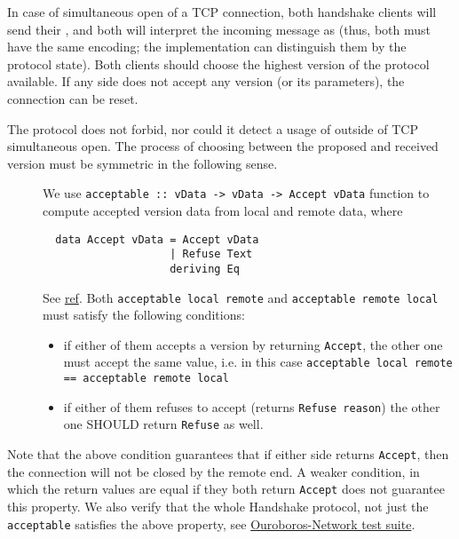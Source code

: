In case of simultaneous open of a TCP connection, both handshake clients will
send their \MsgProposeVersions{}, and both will interpret the incoming message as
\MsgReplyVersions{} (thus, both must have the same encoding; the implementation
can distinguish them by the protocol state).  Both clients should choose the
highest version of the protocol available.  If any side does not accept any
version (or its parameters), the connection can be reset.

The protocol does not forbid, nor could it detect a usage of
\MsgReplyVersions{} outside of TCP simultaneous open.  The process of
choosing between the proposed and received version must be symmetric in the
following sense.

\begin{description}
  \item[]
    We use \texttt{acceptable :: vData -> vData -> Accept vData}
    function to compute accepted version data from local and remote data,
    where
\begin{verbatim}
  data Accept vData = Accept vData
                    | Refuse Text
                    deriving Eq
\end{verbatim}
    See
    \href{https://ouroboros-network.cardano.intersectmbo.org/ouroboros-network-framework/Ouroboros-Network-Protocol-Handshake-Version.html#t:Acceptable}{ref}.
    Both \texttt{acceptable local remote} and \texttt{acceptable remote local}
    must satisfy the following conditions:
    \begin{itemize}
      \item if either of them accepts a version by returning \texttt{Accept},
        the other one must accept the same value, i.e. in this case
        \texttt{acceptable local remote == acceptable remote local}
      \item if either of them refuses to accept (returns \texttt{Refuse reason})
        the other one SHOULD return \texttt{Refuse} as well.
    \end{itemize}
\end{description}
Note that the above condition guarantees that if either side returns
\texttt{Accept}, then the connection will not be closed by the remote end.
A weaker condition, in which the return values are equal if they both return
\texttt{Accept} does not guarantee this property.  We also verify that the
whole Handshake protocol, not just the \texttt{acceptable} satisfies the above
property, see
\href{https://github.com/intersectmbo/ouroboros-network/blob/master/ouroboros-network/protocol-tests/Ouroboros/Network/Protocol/Handshake/Test.hs}{Ouroboros-Network
test suite}.

